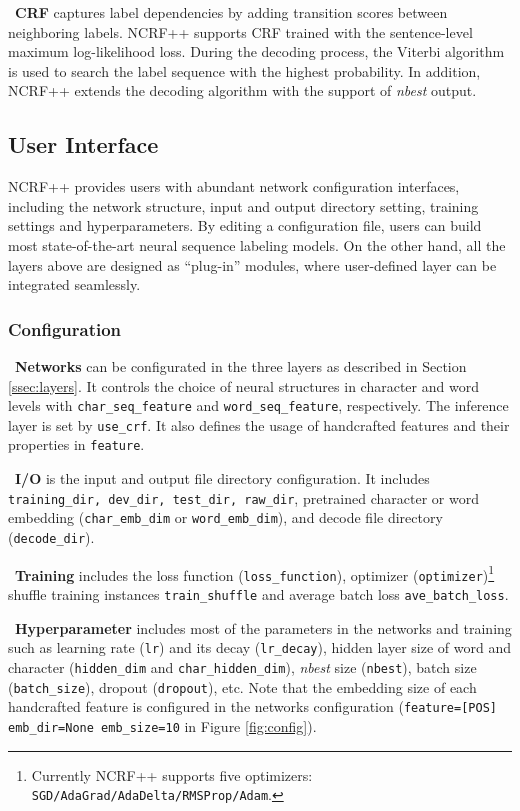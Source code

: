 \documentclass[11pt,a4paper]{article}
\begin{document}
\noindent \textbullet $\,$  \textbf{CRF} captures label dependencies by adding transition scores between neighboring labels. NCRF++ supports CRF trained with the sentence-level maximum log-likelihood loss. During the decoding process, the Viterbi algorithm is used to search the label sequence with the highest probability. In addition, NCRF++ extends the decoding algorithm with the support of \textit{nbest} output.

\subsection{User Interface}
NCRF++ provides users with abundant network configuration interfaces, including the network structure, input and output directory setting, training settings and hyperparameters. By editing a configuration file, users can build most state-of-the-art neural sequence labeling models. On the other hand, all the layers above are designed as ``plug-in'' modules, where user-defined layer can be integrated seamlessly.

\subsubsection{Configuration}
\noindent \textbullet $\,$ \textbf{Networks} can be configurated in the three layers as described in Section \ref{ssec:layers}. It controls the choice of neural structures in character and word levels with \texttt{char\_seq\_feature} and \texttt{word\_seq\_feature}, respectively. The inference layer is set by \texttt{use\_crf}. It also defines the usage of handcrafted features and their properties in \texttt{feature}. 

\noindent \textbullet $\,$ \textbf{I/O} is the input and output file directory configuration. It includes \texttt{training\_dir, dev\_dir, test\_dir, raw\_dir}, pretrained character or word embedding (\texttt{char\_emb\_dim} or \texttt{word\_emb\_dim}), and decode file directory (\texttt{decode\_dir}).

\noindent \textbullet \, \textbf{Training} includes the loss function (\texttt{loss\_function}), optimizer (\texttt{optimizer})\footnote{Currently NCRF++ supports five optimizers: \texttt{SGD/AdaGrad/AdaDelta/RMSProp/Adam}.} shuffle training instances \texttt{train\_shuffle} and average batch loss \texttt{ave\_batch\_loss}.

\noindent \textbullet $\,$ \textbf{Hyperparameter} includes most of the parameters in the networks and training such as learning rate (\texttt{lr}) and its decay (\texttt{lr\_decay}), hidden layer size of word and character (\texttt{hidden\_dim} and \texttt{char\_hidden\_dim}), \textit{nbest} size (\texttt{nbest}), batch size (\texttt{batch\_size}), dropout (\texttt{dropout}), etc. Note that the embedding size of each handcrafted feature is configured in the networks configuration (\texttt{feature=[POS] emb\_dir=None emb\_size=10} in Figure \ref{fig:config}).
\end{document}
